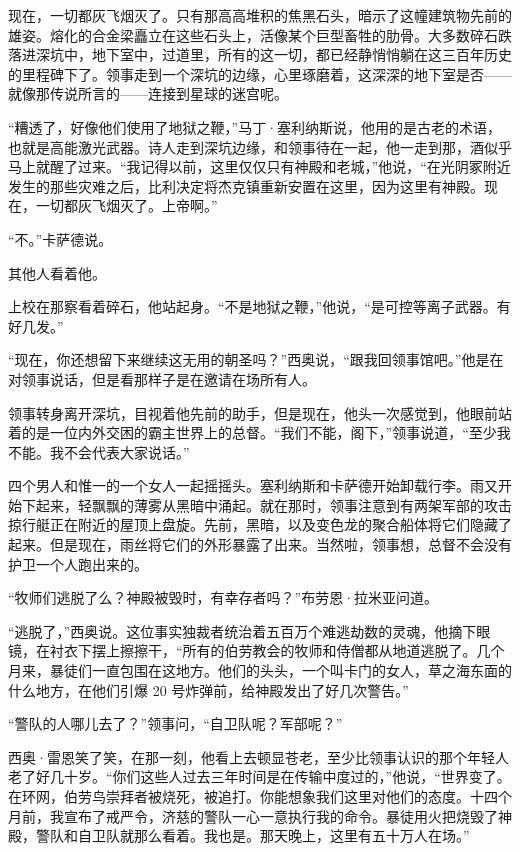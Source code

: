 \documentclass[AutoFakeBold=true]{book}
\begin{document}
现在，一切都灰飞烟灭了。只有那高高堆积的焦黑石头，暗示了这幢建筑物先前的雄姿。熔化的合金梁矗立在这些石头上，活像某个巨型畜牲的肋骨。大多数碎石跌落进深坑中，地下室中，过道里，所有的这一切，都已经静悄悄躺在这三百年历史的里程碑下了。领事走到一个深坑的边缘，心里琢磨着，这深深的地下室是否——就像那传说所言的——连接到星球的迷宫呢。

``糟透了，好像他们使用了地狱之鞭，''马丁·塞利纳斯说，他用的是古老的术语，也就是高能激光武器。诗人走到深坑边缘，和领事待在一起，他一走到那，酒似乎马上就醒了过来。``我记得以前，这里仅仅只有神殿和老城，''他说，``在光阴冢附近发生的那些灾难之后，比利决定将杰克镇重新安置在这里，因为这里有神殿。现在，一切都灰飞烟灭了。上帝啊。''

``不。''卡萨德说。

其他人看着他。

上校在那察看着碎石，他站起身。``不是地狱之鞭，''他说，``是可控等离子武器。有好几发。''

``现在，你还想留下来继续这无用的朝圣吗？''西奥说，``跟我回领事馆吧。''他是在对领事说话，但是看那样子是在邀请在场所有人。

领事转身离开深坑，目视着他先前的助手，但是现在，他头一次感觉到，他眼前站着的是一位内外交困的霸主世界上的总督。``我们不能，阁下，''领事说道，``至少我不能。我不会代表大家说话。''

四个男人和惟一的一个女人一起摇摇头。塞利纳斯和卡萨德开始卸载行李。雨又开始下起来，轻飘飘的薄雾从黑暗中涌起。就在那时，领事注意到有两架军部的攻击掠行艇正在附近的屋顶上盘旋。先前，黑暗，以及变色龙的聚合船体将它们隐藏了起来。但是现在，雨丝将它们的外形暴露了出来。当然啦，领事想，总督不会没有护卫一个人跑出来的。

``牧师们逃脱了么？神殿被毁时，有幸存者吗？''布劳恩·拉米亚问道。

``逃脱了，''西奥说。这位事实独裁者统治着五百万个难逃劫数的灵魂，他摘下眼镜，在衬衣下摆上擦擦干，``所有的伯劳教会的牧师和侍僧都从地道逃脱了。几个月来，暴徒们一直包围在这地方。他们的头头，一个叫卡门的女人，草之海东面的什么地方，在他们引爆 20 号炸弹前，给神殿发出了好几次警告。''

``警队的人哪儿去了？''领事问，``自卫队呢？军部呢？''

西奥·雷恩笑了笑，在那一刻，他看上去顿显苍老，至少比领事认识的那个年轻人老了好几十岁。``你们这些人过去三年时间是在传输中度过的，''他说，``世界变了。在环网，伯劳鸟崇拜者被烧死，被追打。你能想象我们这里对他们的态度。十四个月前，我宣布了戒严令，济慈的警队一心一意执行我的命令。暴徒用火把烧毁了神殿，警队和自卫队就那么看着。我也是。那天晚上，这里有五十万人在场。''
\end{document}
